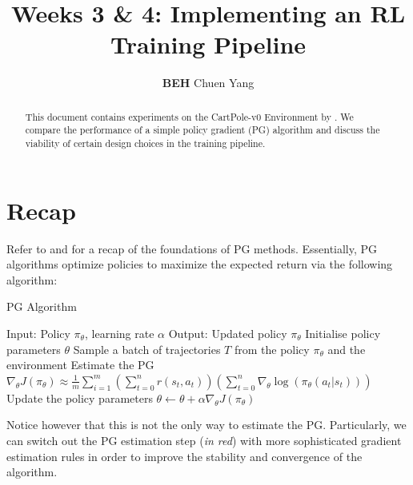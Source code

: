 \documentclass{article} %
\title{Weeks 3 \& 4: Implementing an RL Training Pipeline}
\author{\textbf{BEH} Chuen Yang}
\begin{document}
\ifcolmsubmission
\linenumbers
\fi

\maketitle

\begin{abstract}
This document contains experiments on the CartPole-v0 Environment by \cite{Towers-et-al-2024}.
We compare the performance of a simple policy gradient (PG) algorithm and discuss
the viability of certain design choices in the training pipeline.
\end{abstract}

\section{Recap}
Refer to \cite{Levine-et-al-2023} and \cite{Week2} for a recap of the foundations of PG methods.
Essentially, PG algorithms optimize policies to maximize the expected return
via the following algorithm:

\begin{algorithm}[H]
    \caption{PG Algorithm}
    \label{alg:policy_gradient}
    \begin{algorithmic}[1]
        \State Input: Policy $\pi_\theta$, learning rate $\alpha$
        \State Output: Updated policy $\pi_\theta$
        \State Initialise policy parameters $\theta$
            \State Sample a batch of trajectories $T$ from the policy $\pi_\theta$ and the environment
            \State Estimate the PG {\color{red} $\nabla_\theta J(\pi_\theta) \approx \frac{1}{m} \sum_{i=1}^{m} \left(\sum_{t=0}^{n} r(s_t, a_t)\right) \left( \sum_{t=0}^{n} \nabla_\theta \log(\pi_\theta(a_t | s_t)) \right)$}
            \State Update the policy parameters $\theta \leftarrow \theta + \alpha \nabla_\theta J(\pi_\theta)$
        \EndWhile
    \end{algorithmic}
\end{algorithm}

Notice however that this is not the only way to estimate the PG.
Particularly, we can switch out the PG estimation step (\textit{in red})
with more sophisticated gradient estimation rules in order to improve the stability and convergence of the algorithm.
\end{document}
